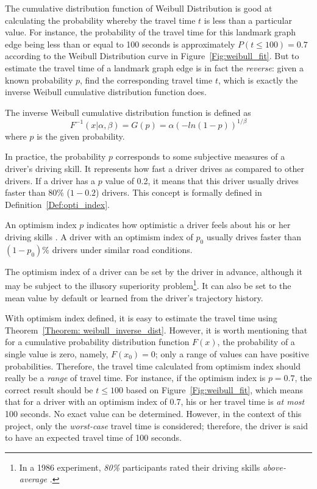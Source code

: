The cumulative distribution function of Weibull Distribution is good at calculating the probability whereby the travel time $t$ is less than a particular value. For instance, the probability of the travel time for this landmark graph edge being less than or equal to 100 seconds is approximately $P(t\leq100) = 0.7$ according to the Weibull Distribution curve in Figure~\ref{Fig:weibull_fit}. But to estimate the travel time of a landmark graph edge is in fact the \emph{reverse}: given a known probability $p$, find the corresponding travel time $t$, which is exactly the inverse Weibull cumulative distribution function does. 

\begin{theorem}\label{Theorem: weibull_inverse_dist}
The inverse Weibull cumulative distribution function is defined as
\begin{equation}
F^{-1}(x | \alpha, \beta) = G(p) = \alpha(-ln(1 - p)) ^ {1/\beta}
\end{equation}
where $p$ is the given probability.
\end{theorem}

In practice, the probability $p$ corresponds to some subjective measures of a driver's driving skill. It represents how fast a driver drives as compared to other drivers. If a driver has a $p$ value of 0.2, it means that this driver usually drives faster than 80\% ($1 - 0.2$) drivers. This concept is formally defined in Definition~\ref{Def:opti_index}.

\begin{defn}\label{Def:opti_index}
An optimism index $p$ indicates how optimistic a driver feels about his or her driving skills \cite{TDR10}. A driver with an optimism index of $p_{0}$ usually drives faster than $(1 - p_{0})\%$ drivers under similar road conditions.
\end{defn}

The optimism index of a driver can be set by the driver in advance, although it may be subject to the illusory superiority problem\footnote{In a 1986 experiment, \emph{80\%} participants rated their driving skills \emph{above-average} \cite{IFD86}.}. It can also be set to the mean value by default or learned from the driver's trajectory history. 

With optimism index defined, it is easy to estimate the travel time using Theorem~\ref{Theorem: weibull_inverse_dist}. However, it is worth mentioning that for a cumulative probability distribution function $F(x)$, the probability of a single value is zero, namely, $F(x_{0}) = 0$; only a range of values can have positive probabilities. Therefore, the travel time calculated from optimism index should really be a \emph{range} of travel time. For instance, if the optimism index is $p = 0.7$, the correct result should be $t \leq 100$ based on Figure~\ref{Fig:weibull_fit}, which means that for a driver with an optimism index of 0.7, his or her travel time is \emph{at most} 100 seconds. No exact value can be determined. However, in the context of this project, only the \emph{worst-case} travel time is considered; therefore, the driver is said to have an expected travel time of 100 seconds. 


